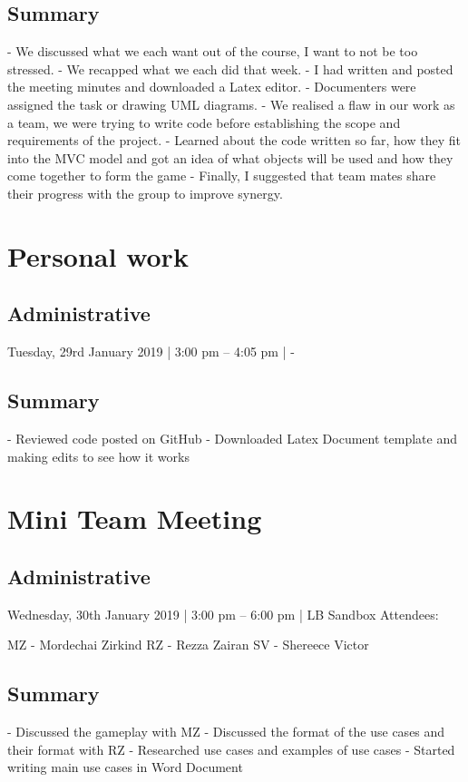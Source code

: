 \documentclass[12pt]{article}
\begin{document}
\subsection{Summary}
-	We discussed what we each want out of the course, I want to not be too stressed. 
-	We recapped what we each did that week. 
-	I had written and posted the meeting minutes and downloaded a Latex editor. 
-	Documenters were assigned the task or drawing UML diagrams.
-	We realised a flaw in our work as a team, we were trying to write code before establishing the scope and requirements of the project. 
-	Learned about the code written so far, how they fit into the MVC model and got an idea of what objects will be used and how they come together to form the game 
-	Finally, I suggested that team mates share their progress with the group to improve synergy. 




\pagebreak

\section{Personal work }

\subsection{Administrative}
Tuesday, 29rd January 2019 | 3:00 pm – 4:05 pm | -



\subsection{Summary}
-	Reviewed code posted on GitHub
-	Downloaded Latex Document template and making edits to see how it works   




\pagebreak
\section{Mini Team Meeting }

\subsection{Administrative}
Wednesday, 30th January 2019 | 3:00 pm – 6:00 pm | LB Sandbox
Attendees: 

MZ - Mordechai Zirkind  
RZ - Rezza Zairan 
SV - Shereece Victor 



\subsection{Summary}
-	Discussed the gameplay with MZ 
-	Discussed the format of the use cases and their format with RZ 
-	Researched use cases and examples of use cases 
-	Started writing main use cases in Word Document 
\end{document}
